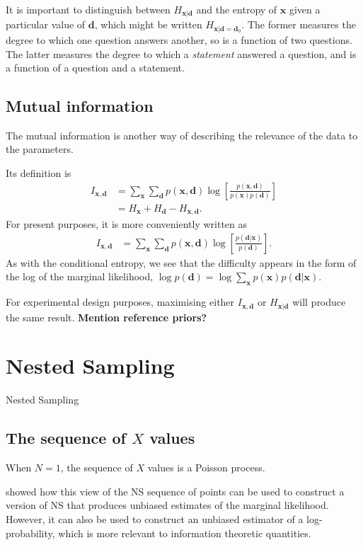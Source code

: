 \documentclass[journal,article,accept,moreauthors,pdftex,12pt,a4paper]{mdpi}
\renewcommand{\d}{\boldsymbol{d}}
\newcommand{\todo}{\color{orange} \bf}
\newcommand{\x}{\boldsymbol{x}}
\begin{document}
It is important to distinguish between $H_{\x | \d}$ and the
entropy of $\x$ given a particular value of $\d$, which might be written
$H_{\x | \d=\d_0}$.
The former measures the degree to which one question answers
another, so is a function of two questions. The latter measures the
degree to which a {\em statement} answered a question, and is a function
of a question and a statement.



\subsection{Mutual information}
The mutual information is another way of describing the relevance of the
data to the parameters.

Its definition is
\begin{align}
I_{\x, \d} &= \sum_{\x} \sum_{\d} p(\x, \d)
                       \log\left[\frac{p(\x, \d)}{p(\x)p(\d)}\right]\\
           &= H_{\x} + H_{\d} - H_{\x, \d}.
\end{align}
For present purposes, it is more conveniently written as
\begin{align}
I_{\x, \d} &= \sum_{\x} \sum_{\d} p(\x, \d)
              \log\left[\frac{p(\d | \x)}{p(\d)}\right].
\end{align}
As with the conditional entropy, we see that the difficulty appears in the
form of the log of the marginal likelihood,
$\log p(\d) = \log \sum_{\x} p(\x)p(\d | \x)$.


For experimental design purposes, maximising either $I_{\x, \d}$ or
$H_{\x | \d}$ will produce the same result. {\todo Mention reference priors?}


\section{Nested Sampling}
Nested Sampling \citep[NS][]{skilling2006nested}


\subsection{The sequence of $X$ values}
When $N=1$, the sequence of $X$ values is a Poisson process.

\citet{Walter2015} showed how this view of the NS sequence of points
can be used to construct a
version of NS that produces unbiased estimates of the marginal likelihood.
However, it can also be used to construct an unbiased estimator of
a log-probability, which is more relevant to information theoretic
quantities.
\end{document}
